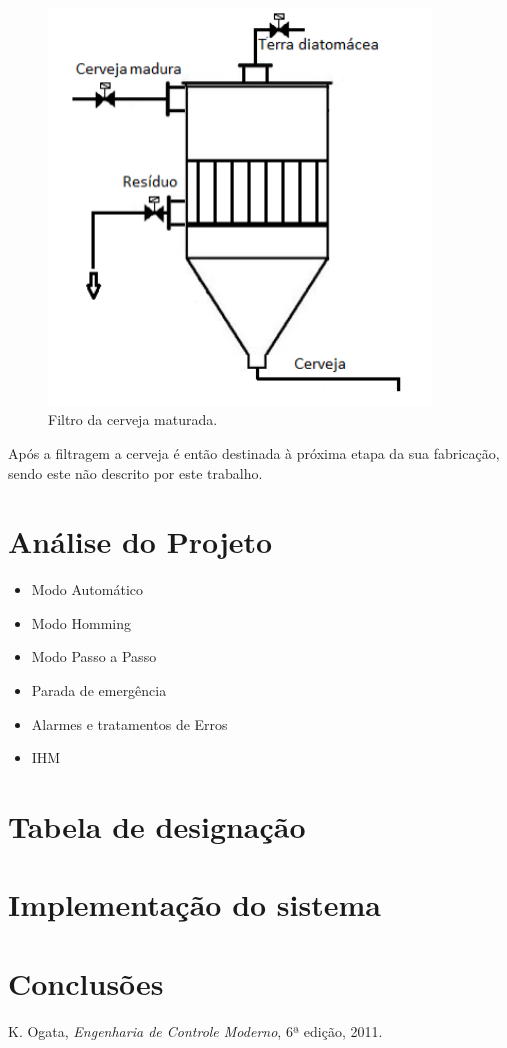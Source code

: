 \documentclass[12pt]{article}
\begin{document}
\begin{figure}[H]
\centering
\includegraphics [width=4in]{filtro.png}
\caption {Filtro da cerveja maturada.}
\label{fig:corrente}
\end{figure}

\begin{par}
Após a filtragem a cerveja é então destinada à próxima etapa da sua fabricação, sendo este não descrito por este trabalho.
\end{par}


\section {Análise do Projeto}
\begin {itemize}
\item Modo Automático

\item Modo Homming

\item Modo Passo a Passo

\item Parada de emergência

\item Alarmes e tratamentos de Erros

\item IHM
\end{itemize}

\section {Tabela de designação}

\section {Implementação do sistema}

\section {Conclusões}

\begin{thebibliography}{5}

 K. Ogata, \emph{Engenharia de Controle Moderno}, 6ª edição, 2011.

\end{thebibliography}
\end{document}
